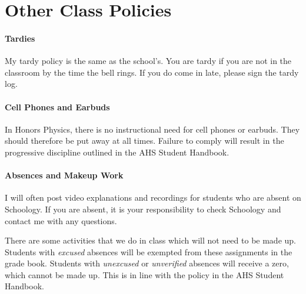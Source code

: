 \documentclass[10pt]{exam}
\begin{document}
\section*{Other Class Policies}

\paragraph{Tardies}
	My tardy policy is the same as the school's. You are tardy if you are not in the classroom by the time the bell rings.  If you do come in late, please sign the tardy log.

\paragraph{Cell Phones and Earbuds}
	In Honors Physics, there is no instructional need for cell phones or earbuds.  They should therefore be put away at all times.  Failure to comply will result in the progressive discipline outlined in the AHS Student Handbook.

\paragraph{Absences and Makeup Work}
	I will often post video explanations and recordings for students who are absent on Schoology.  If you are absent, it is your responsibility to check Schoology and contact me with any questions.

	There are some activities that we do in class which will not need to be made up.  Students with \emph{excused} absences will be exempted from these assignments in the grade book.  Students with \emph{unexcused} or \emph{unverified} absences will receive a zero, which cannot be made up.  This is in line with the policy in the AHS Student Handbook.
\end{document}
